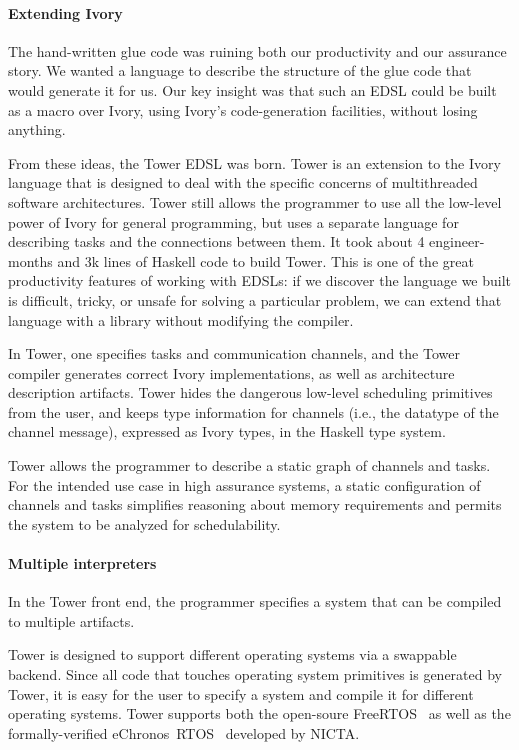 \paragraph{Extending Ivory}
The hand-written glue code was ruining both our productivity and our assurance
story. We wanted a language to describe the structure of the glue code that
would generate it for us.
Our key insight was that such an EDSL could be built as a macro over Ivory,
using Ivory's code-generation facilities, without losing anything.

From these ideas, the Tower EDSL was born. Tower is an extension to the Ivory
language that is designed to deal with the specific concerns of multithreaded
software architectures. Tower still allows the programmer to use all the
low-level power of Ivory for general programming, but uses a separate language
for describing tasks and the connections between them.  It took about 4
engineer-months and 3k lines of Haskell code to build Tower.  This is one of the
great productivity features of working with EDSLs: if we discover the language
we built is difficult, tricky, or unsafe for solving a particular problem,
we can extend that language with a library without modifying the
compiler.

In Tower, one specifies tasks and communication channels, and the Tower compiler
generates correct Ivory implementations, as well as architecture description
artifacts. Tower hides the dangerous low-level scheduling primitives from the
user, and keeps type information for channels (i.e., the datatype of the channel
message), expressed as Ivory types, in the Haskell type system.

Tower allows the programmer to describe a static graph of channels and tasks.
For the intended use case in high assurance systems, a static configuration of
channels and tasks simplifies reasoning about memory requirements and permits
the system to be analyzed for schedulability.

\paragraph{Multiple interpreters}

In the Tower front end, the programmer specifies a system that can be compiled
to multiple artifacts.

Tower is designed to support different operating systems via a swappable
backend. Since all code that touches operating system primitives is generated by
Tower, it is easy for the user to specify a system and compile it for
different operating systems. Tower supports both the open-soure
FreeRTOS~\cite{freertos} as well as the formally-verified
eChronos~RTOS~\cite{echronos} developed by NICTA.

